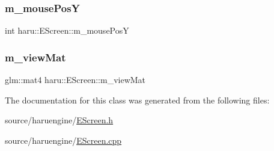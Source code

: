 \subsubsection{\texorpdfstring{m\+\_\+mouse\+PosY}{m\_mousePosY}}
{\footnotesize\ttfamily int haru\+::\+E\+Screen\+::m\+\_\+mouse\+PosY}

\mbox{\label{classharu_1_1_e_screen_ac0d95afec2a766900d06e922978b5a72}} 
\subsubsection{\texorpdfstring{m\+\_\+view\+Mat}{m\_viewMat}}
{\footnotesize\ttfamily glm\+::mat4 haru\+::\+E\+Screen\+::m\+\_\+view\+Mat}



The documentation for this class was generated from the following files\+:\begin{DoxyCompactItemize}
\item 
source/haruengine/\mbox{\hyperlink{_e_screen_8h}{E\+Screen.\+h}}\item 
source/haruengine/\mbox{\hyperlink{_e_screen_8cpp}{E\+Screen.\+cpp}}\end{DoxyCompactItemize}
